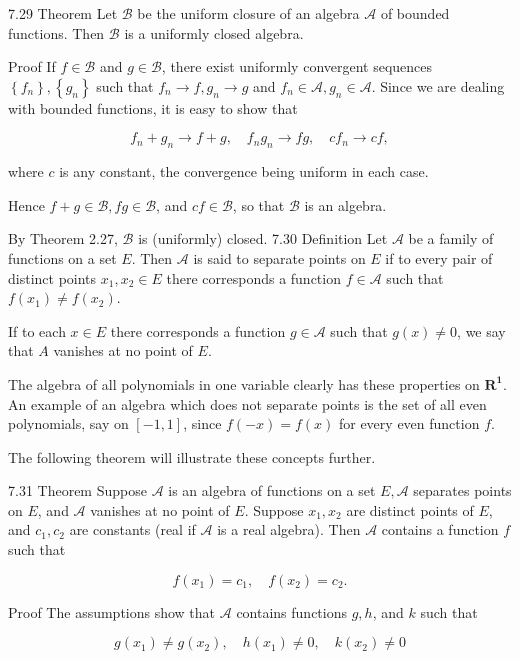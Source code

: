 \documentclass[10pt]{article}
\begin{document}
7.29 Theorem Let $\mathscr{B}$ be the uniform closure of an algebra $\mathscr{A}$ of bounded functions. Then $\mathscr{B}$ is a uniformly closed algebra.

Proof If $f \in \mathscr{B}$ and $g \in \mathscr{B}$, there exist uniformly convergent sequences $\left\{f_{n}\right\},\left\{g_{n}\right\}$ such that $f_{n} \rightarrow f, g_{n} \rightarrow g$ and $f_{n} \in \mathscr{A}, g_{n} \in \mathscr{A}$. Since we are dealing with bounded functions, it is easy to show that

$$
f_{n}+g_{n} \rightarrow f+g, \quad f_{n} g_{n} \rightarrow f g, \quad c f_{n} \rightarrow c f,
$$

where $c$ is any constant, the convergence being uniform in each case.

Hence $f+g \in \mathscr{B}, f g \in \mathscr{B}$, and $c f \in \mathscr{B}$, so that $\mathscr{B}$ is an algebra.

By Theorem 2.27, $\mathscr{B}$ is (uniformly) closed. 7.30 Definition Let $\mathscr{A}$ be a family of functions on a set $E$. Then $\mathscr{A}$ is said to separate points on $E$ if to every pair of distinct points $x_{1}, x_{2} \in E$ there corresponds a function $f \in \mathscr{A}$ such that $f\left(x_{1}\right) \neq f\left(x_{2}\right)$.

If to each $x \in E$ there corresponds a function $g \in \mathscr{A}$ such that $g(x) \neq 0$, we say that $A$ vanishes at no point of $E$.

The algebra of all polynomials in one variable clearly has these properties on $\boldsymbol{R}^{\mathbf{1}}$. An example of an algebra which does not separate points is the set of all even polynomials, say on $[-1,1]$, since $f(-x)=f(x)$ for every even function $f$.

The following theorem will illustrate these concepts further.

7.31 Theorem Suppose $\mathscr{A}$ is an algebra of functions on a set $E, \mathscr{A}$ separates points on $E$, and $\mathscr{A}$ vanishes at no point of $E$. Suppose $x_{1}, x_{2}$ are distinct points of $E$, and $c_{1}, c_{2}$ are constants (real if $\mathscr{A}$ is a real algebra). Then $\mathscr{A}$ contains a function $f$ such that

$$
f\left(x_{1}\right)=c_{1}, \quad f\left(x_{2}\right)=c_{2} .
$$

Proof The assumptions show that $\mathscr{A}$ contains functions $g, h$, and $k$ such that

$$
g\left(x_{1}\right) \neq g\left(x_{2}\right), \quad h\left(x_{1}\right) \neq 0, \quad k\left(x_{2}\right) \neq 0
$$
\end{document}
